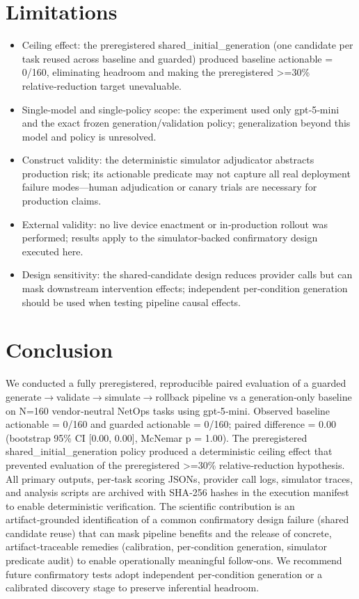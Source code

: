 \documentclass[conference]{IEEEtran}
\begin{document}
\section{Limitations}
\begin{itemize}
\item Ceiling effect: the preregistered shared\_initial\_generation (one candidate per task reused across baseline and guarded) produced baseline actionable = 0/160, eliminating headroom and making the preregistered >=30\% relative‑reduction target unevaluable.
\item Single‑model and single‑policy scope: the experiment used only gpt‑5‑mini and the exact frozen generation/validation policy; generalization beyond this model and policy is unresolved.
\item Construct validity: the deterministic simulator adjudicator abstracts production risk; its actionable predicate may not capture all real deployment failure modes---human adjudication or canary trials are necessary for production claims.
\item External validity: no live device enactment or in‑production rollout was performed; results apply to the simulator‑backed confirmatory design executed here.
\item Design sensitivity: the shared‑candidate design reduces provider calls but can mask downstream intervention effects; independent per‑condition generation should be used when testing pipeline causal effects.
\end{itemize}

\section{Conclusion}
We conducted a fully preregistered, reproducible paired evaluation of a guarded generate\ensuremath{\rightarrow}validate\ensuremath{\rightarrow}simulate\ensuremath{\rightarrow}rollback pipeline vs a generation‑only baseline on N=160 vendor‑neutral NetOps tasks using gpt‑5‑mini. Observed baseline actionable = 0/160 and guarded actionable = 0/160; paired difference = 0.00 (bootstrap 95\% CI [0.00, 0.00], McNemar p = 1.00). The preregistered shared\_initial\_generation policy produced a deterministic ceiling effect that prevented evaluation of the preregistered >=30\% relative‑reduction hypothesis. All primary outputs, per‑task scoring JSONs, provider call logs, simulator traces, and analysis scripts are archived with SHA‑256 hashes in the execution manifest to enable deterministic verification. The scientific contribution is an artifact‑grounded identification of a common confirmatory design failure (shared candidate reuse) that can mask pipeline benefits and the release of concrete, artifact‑traceable remedies (calibration, per‑condition generation, simulator predicate audit) to enable operationally meaningful follow‑ons. We recommend future confirmatory tests adopt independent per‑condition generation or a calibrated discovery stage to preserve inferential headroom.
\end{document}
